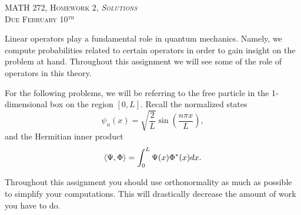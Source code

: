 \documentclass[12pt]{article} %
\begin{document}
\begin{center}
   \textsc{\large MATH 272, Homework 2, \emph{Solutions}}\\
   \textsc{Due February 10$^\textrm{th}$}
\end{center}
\vspace{.5cm}

Linear operators play a fundamental role in quantum mechanics. Namely, we compute probabilities related to certain operators in order to gain insight on the problem at hand.  Throughout this assignment we will see some of the role of operators in this theory.  

For the following problems, we will be referring to the free particle in the 1-dimensional box on the region $[0,L]$. Recall the normalized states
   \[
   \psi_n(x) = \sqrt{\frac{2}{L}} \sin\left(\frac{n\pi x}{L}\right),
   \]
   and the Hermitian inner product
   \[
   \left\langle \Psi, \Phi \right\rangle = \int_0^L \Psi(x)\Phi^*(x)dx.
   \]
   
   Throughout this assignment you should use orthonormality as much as possible to simplify your computations. This will drastically decrease the amount of work you have to do.
\end{document}
